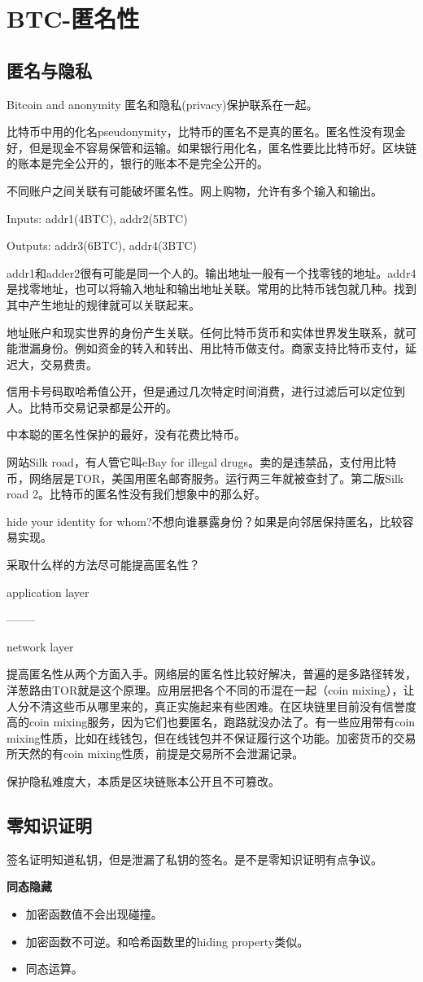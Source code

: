 \documentclass[10pt]{ctexart}
\begin{document}
\section{BTC-匿名性}
\subsection{匿名与隐私}
Bitcoin and anonymity
匿名和隐私(privacy)保护联系在一起。

比特币中用的化名pseudonymity，比特币的匿名不是真的匿名。匿名性没有现金好，但是现金不容易保管和运输。如果银行用化名，匿名性要比比特币好。区块链的账本是完全公开的，银行的账本不是完全公开的。

不同账户之间关联有可能破坏匿名性。网上购物，允许有多个输入和输出。

Inputs: addr1(4BTC), addr2(5BTC)

Outputs: addr3(6BTC), addr4(3BTC)

addr1和adder2很有可能是同一个人的。输出地址一般有一个找零钱的地址。addr4是找零地址，也可以将输入地址和输出地址关联。常用的比特币钱包就几种。找到其中产生地址的规律就可以关联起来。

地址账户和现实世界的身份产生关联。任何比特币货币和实体世界发生联系，就可能泄漏身份。例如资金的转入和转出、用比特币做支付。商家支持比特币支付，延迟大，交易费贵。

信用卡号码取哈希值公开，但是通过几次特定时间消费，进行过滤后可以定位到人。比特币交易记录都是公开的。

中本聪的匿名性保护的最好，没有花费比特币。

网站Silk road，有人管它叫eBay for illegal drugs。卖的是违禁品，支付用比特币，网络层是TOR，美国用匿名邮寄服务。运行两三年就被查封了。第二版Silk road 2。比特币的匿名性没有我们想象中的那么好。

hide your identity for whom?不想向谁暴露身份？如果是向邻居保持匿名，比较容易实现。

采取什么样的方法尽可能提高匿名性？

application layer

--------

network layer

提高匿名性从两个方面入手。网络层的匿名性比较好解决，普遍的是多路径转发，洋葱路由TOR就是这个原理。应用层把各个不同的币混在一起（coin mixing），让人分不清这些币从哪里来的，真正实施起来有些困难。在区块链里目前没有信誉度高的coin mixing服务，因为它们也要匿名，跑路就没办法了。有一些应用带有coin mixing性质，比如在线钱包，但在线钱包并不保证履行这个功能。加密货币的交易所天然的有coin mixing性质，前提是交易所不会泄漏记录。

保护隐私难度大，本质是区块链账本公开且不可篡改。

\subsection{零知识证明}
签名证明知道私钥，但是泄漏了私钥的签名。是不是零知识证明有点争议。

\textbf{同态隐藏}
\begin{itemize}
    \item 加密函数值不会出现碰撞。
    \item 加密函数不可逆。和哈希函数里的hiding property类似。
    \item 同态运算。
\end{itemize}
 
\end{document}
